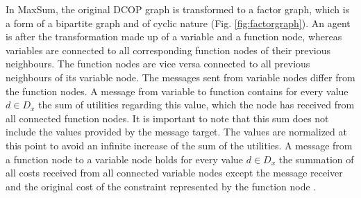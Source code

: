 In MaxSum, the original DCOP graph is transformed to a factor graph, which is a form of a bipartite graph and of cyclic nature (Fig. \ref{fig:factorgraph}). An agent is after the transformation made up of a variable and a function node, whereas variables are connected to all corresponding function nodes of  their previous neighbours. The function nodes are vice versa connected to all previous neighbours of its variable node. 
The messages sent from variable nodes differ from the function nodes. A message from variable to function contains for every value \(d \in D_{x}\) the sum of utilities regarding this value, which the node has received from all connected function nodes. It is important to note that this sum does not include the values provided by the message target. The values are normalized at this point to avoid an infinite increase of the sum of the utilities. A message from a function node to a variable node holds for every value  \(d \in D_{x}\)  the summation of all costs received from all connected variable nodes except the message receiver and the original cost of the constraint represented by the function node \cite{Zivan2012}.


    
    